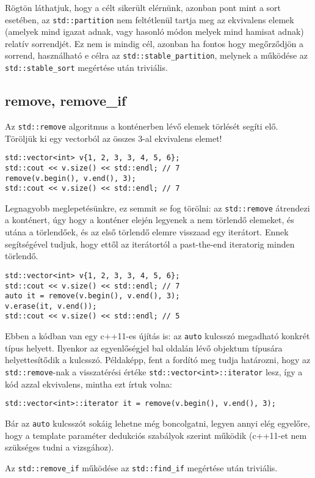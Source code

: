 \documentclass[../cpp_book/cpp_book.tex]{subfiles}
\begin{document}
	Rögtön láthatjuk, hogy a célt sikerült elérnünk, azonban pont mint a sort esetében, az \texttt{std::partition} nem feltétlenül tartja meg az ekvivalens elemek (amelyek mind igazat adnak, vagy hasonló módon melyek mind hamisat adnak) relatív sorrendjét. Ez nem is mindig cél, azonban ha fontos hogy megőrződjön a sorrend, használható e célra az \texttt{std::stable\_partition}, melynek a működése az \texttt{std::stable\_sort} megértése után triviális.
	\subsection{remove, remove\_if}
	Az \texttt{std::remove} algoritmus a konténerben lévő elemek törlését segíti elő. Töröljük ki egy vectorból az összes 3-al ekvivalens elemet!
	\begin{lstlisting}
std::vector<int> v{1, 2, 3, 3, 4, 5, 6};
std::cout << v.size() << std::endl; // 7
remove(v.begin(), v.end(), 3);
std::cout << v.size() << std::endl; // 7
	\end{lstlisting}
	Legnagyobb meglepetésünkre, ez semmit se fog törölni: az \texttt{std::remove} átrendezi a konténert, úgy hogy a konténer elején legyenek a nem törlendő elemeket, és utána a törlendőek, és az első törlendő elemre visszaad egy iterátort. Ennek segítségével tudjuk, hogy ettől az iterátortól a past-the-end iteratorig minden törlendő.
	\begin{lstlisting}
std::vector<int> v{1, 2, 3, 3, 4, 5, 6};
std::cout << v.size() << std::endl; // 7
auto it = remove(v.begin(), v.end(), 3);
v.erase(it, v.end());
std::cout << v.size() << std::endl; // 5
	\end{lstlisting}
	\begin{note}
		Ebben a kódban van egy c++11-es újítás is: az \texttt{auto} kulcsszó megadható konkrét típus helyett. Ilyenkor az egyenlőségjel bal oldalán lévő objektum típusára helyettesítődik a kulcsszó. Példaképp, fent a fordító meg tudja határozni, hogy az \texttt{std::remove}-nak a visszatérési értéke \texttt{std::vector<int>::iterator} lesz, így a kód azzal ekvivalens, mintha ezt írtuk volna:
		
		{\centering\texttt{std::vector<int>::iterator it = remove(v.begin(), v.end(), 3);} \par}
		
		Bár az \texttt{auto} kulcsszót sokáig lehetne még boncolgatni, legyen annyi elég egyelőre, hogy a template paraméter dedukciós szabályok szerint működik (c++11-et nem szükséges tudni a vizsgához).
	\end{note}
	Az \texttt{std::remove\_if} működése az \texttt{std::find\_if} megértése után triviális.
	
\end{document}
